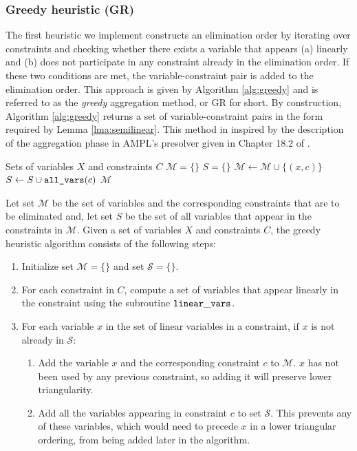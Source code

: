 \documentclass[smallextended]{svjour3}
\newcommand{\rev}[1]{{#1}}
\begin{document}
\subsubsection{Greedy heuristic \rev{(GR)}}
The first heuristic we implement constructs an elimination order by iterating over
constraints and checking whether there exists a variable that appears (a) linearly
and (b) does not participate in any constraint already in the elimination order.
If these two conditions are met, the variable-constraint pair is added to the
elimination order. This approach is given by Algorithm \ref{alg:greedy} and
is referred to as the {\it greedy} aggregation method, or GR for short.
By construction, Algorithm \ref{alg:greedy} returns a set of variable-constraint
pairs in the form required by Lemma \ref{lma:semilinear}.
This method in inspired by the description of the aggregation phase in AMPL's
presolver given in Chapter 18.2 of \cite{ampl}.
\begin{algorithm}
  \caption{: {\tt greedy\_aggregation\_set}}
  \begin{algorithmic}[1]
     Sets of variables $X$ and constraints $C$
    \State $\mathcal{M} = \{\}$
    \State $S = \{\}$
          \State $\mathcal{M} \gets \mathcal{M}\cup \{(x, c)\}$
          \State $S \gets S \cup \text{\tt all\_vars}(c)$
        \EndIf
      \EndFor
    \EndFor
     $\mathcal{M}$
  \end{algorithmic}
  \label{alg:greedy}
\end{algorithm}

Let set $\mathcal{M}$ be the set of variables and the corresponding constraints that are to be eliminated and, let set $S$ be the set of all variables that appear in the constraints in $\mathcal{M}$.
Given a set of variables $X$ and constraints $C$, the greedy heuristic algorithm consists of the following steps:
\begin{enumerate}
    \item Initialize set $\mathcal{M} = \{\}$ and set $\mathcal{S}=\{\}$.
    \item For each constraint in $C$, compute a set of variables that appear linearly in the constraint using the subroutine ${\tt linear\_vars}$.
    \item For each variable $x$ in the set of linear variables in a constraint, if $x$ is not already in $\mathcal{S}$:
      \begin{enumerate}
        \item Add the variable $x$ and the corresponding constraint $c$ to $\mathcal{M}$.
          $x$ has not been used by any previous constraint, so adding it will preserve lower triangularity.
        \item Add all the variables appearing in constraint $c$ to set $\mathcal{S}$.
          This prevents any of these variables, which would need to precede $x$ in a lower triangular
          ordering, from being added later in the algorithm.
      \end{enumerate}
\end{enumerate}
\end{document}
